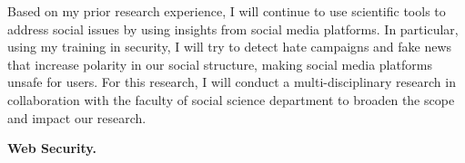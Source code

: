 \documentclass{NSF}
\newcommand{\BfPara}[1]{{\noindent\textbf{#1.}}\xspace}
\begin{document}
Based on my prior research experience, I will continue to use scientific tools to address social issues by using insights from social media platforms. In particular, using my training in security, I will try to detect hate campaigns and fake news that increase polarity in our social structure, making social media platforms unsafe for users. For this research, I will conduct a multi-disciplinary research in collaboration with the faculty of social science department to broaden the scope and impact our research.  

\BfPara{Web Security}
\end{document}
